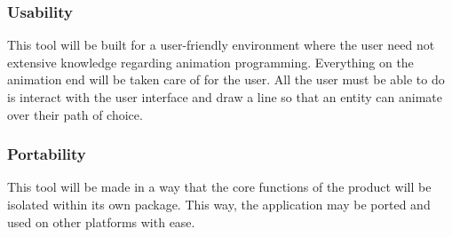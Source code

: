 \subsubsection{Usability}
This tool will be built for a user-friendly environment where the user need not extensive knowledge regarding animation programming. Everything on the animation end will be taken care of for the user. All the user must be able to do is interact with the user interface and draw a line so that an entity can animate over their path of choice.

\subsubsection{Portability}
This tool will be made in a way that the core functions of the product will be isolated within its own package. This way, the application may be ported and used on other platforms with ease.
